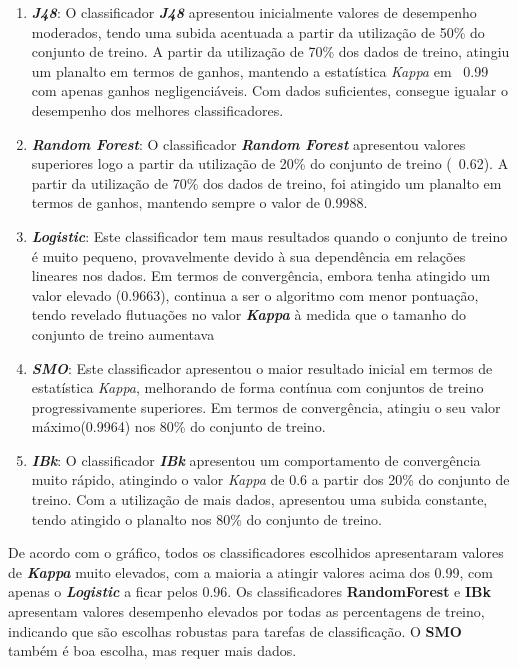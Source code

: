 \documentclass{easychair}
\begin{document}
\begin{enumerate}
	\item \textbf{\textit{J48}}: O classificador \textit{\textbf{J48}} apresentou inicialmente valores de desempenho moderados, tendo uma subida acentuada a partir da utilização de 50\% do conjunto de treino. A partir da utilização de 70\% dos dados de treino, atingiu um planalto em termos de ganhos, mantendo a estatística \textit{Kappa} em ~0.99 com apenas ganhos negligenciáveis. Com dados suficientes, consegue igualar o desempenho dos melhores classificadores.
	\item \textbf{\textit{Random Forest}}: O classificador \textit{\textbf{Random Forest}} apresentou valores superiores logo a partir da utilização de 20\% do conjunto de treino (~0.62). A partir da utilização de 70\% dos dados de treino, foi atingido um planalto em termos de ganhos, mantendo sempre o valor de 0.9988.
	\item \textbf{\textit{Logistic}}: Este classificador tem maus resultados quando o conjunto de treino é muito pequeno, provavelmente devido à sua dependência em relações lineares nos dados. Em termos de convergência, embora tenha atingido um valor elevado (0.9663), continua a ser o algoritmo com menor pontuação, tendo revelado flutuações no valor \textit{\textbf{Kappa}} à medida que o tamanho do conjunto de treino aumentava
	\item \textbf{\textit{SMO}}: Este classificador apresentou o maior resultado inicial em termos de estatística \textit{Kappa}, melhorando de forma contínua com conjuntos de treino progressivamente superiores. Em termos de convergência, atingiu o seu valor máximo(0.9964) nos 80\% do conjunto de treino.
	\item \textbf{\textit{IBk}}: O classificador \textit{\textbf{IBk}} apresentou um comportamento de convergência muito rápido, atingindo o valor \textit{Kappa} de 0.6 a partir dos 20\% do conjunto de treino. Com a utilização de mais dados, apresentou uma subida constante, tendo atingido o planalto nos 80\% do conjunto de treino. 
\end{enumerate}

De acordo com o gráfico, todos os classificadores escolhidos apresentaram valores de \textit{\textbf{Kappa}} muito elevados, com a maioria a atingir valores acima dos 0.99, com apenas o \textit{\textbf{Logistic}} a ficar pelos 0.96.
Os classificadores \textbf{RandomForest} e \textbf{IBk} apresentam valores desempenho elevados por todas as percentagens de treino, indicando que são escolhas robustas para tarefas de classificação. O \textbf{SMO} também é boa escolha, mas requer mais dados.
\end{document}
